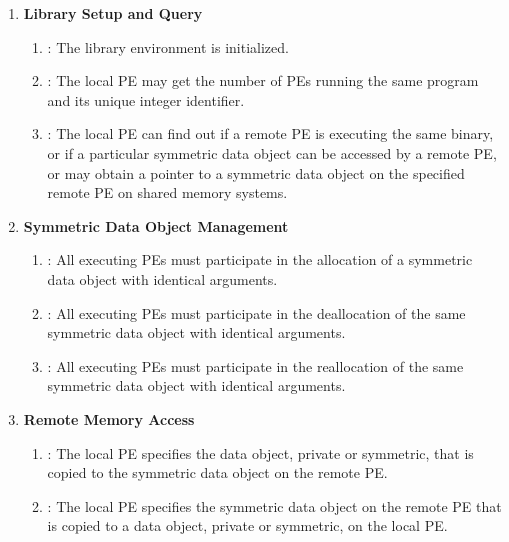 \begin{enumerate}

\item \textbf{Library Setup and Query}
\begin{enumerate}
  \item {}: The \openshmem library environment is initialized. 
  \item {}: The local \ac{PE} may get the number of \acp{PE} running
      the same program and its unique integer identifier. 
  \item {}: The local \ac{PE} can find out if a remote \ac{PE} is
      executing the same binary, or if a particular symmetric data object can be
      accessed by a remote \ac{PE}, or may obtain a pointer to a symmetric data
      object on the specified remote \ac{PE} on shared memory systems.
\end{enumerate}

\item \textbf{Symmetric Data Object Management}
\begin{enumerate}
  \item {}: All executing \acp{PE} must participate in the
      allocation of a symmetric data object with identical arguments.
  \item  {}: All executing \acp{PE} must participate in the
      deallocation of the same symmetric data object with identical arguments.
  \item  {}: All executing \acp{PE} must participate in the
      reallocation of the same symmetric data object with identical arguments.
\end{enumerate}

\item \textbf{Remote Memory Access}
\begin{enumerate}
    \item \PUT: The local \ac{PE} specifies the \source{} data object, private
        or symmetric, that is copied to the symmetric data object on the remote
        \ac{PE}. 
  \item \GET: The local \ac{PE} specifies the symmetric data object on the remote
      \ac{PE} that is copied to a data object, private or symmetric, on the local
      \ac{PE}. 
\end{enumerate}


\end{enumerate}
